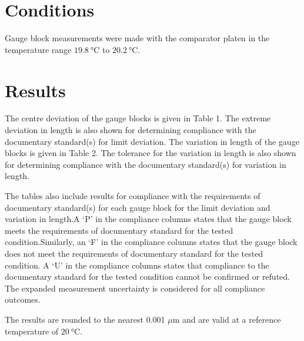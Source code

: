 \documentclass[IANZ]{MSLCalCert}
\begin{document}
\section{Conditions}
Gauge block measurements were made with the comparator platen in the temperature range $\SI{19.8}{\celsius}$ to $\SI{20.2}{\celsius}$.\pagebreak
\section{Results}
The centre deviation of the gauge blocks is given in Table 1. The extreme deviation in length is also shown for determining compliance with the documentary standard(s) for limit deviation. The variation in length of the gauge blocks is given in Table 2. The tolerance for the variation in length is also shown for determining compliance with the documentary standard(s) for variation in length.\par The tables also include results for compliance with the requirements of documentary standard(s) for each gauge block for the limit deviation and variation in length.A ‘P’ in the compliance columns states that the gauge block meets the requirements of documentary standard for the tested condition.Similarly, an ‘F’ in the compliance columns states that the gauge block does not meet the requirements of documentary standard for the tested condition. A ‘U’ in the compliance columns states that compliance to the documentary standard for the tested condition cannot be confirmed or refuted. The expanded measurement uncertainty is considered for all compliance outcomes.\par The results are rounded to the nearest 0.001 $\mu$m and are valid at a reference temperature of $\SI{20}{\celsius}$.\par

\end{document}
